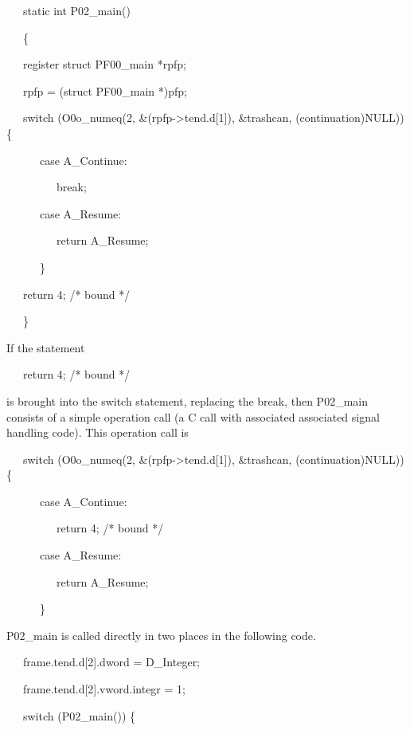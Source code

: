 {\ttfamily\mdseries
\ \ \ static int P02\_main()}

{\ttfamily\mdseries
\ \ \ \{}

{\ttfamily\mdseries
\ \ \ register struct PF00\_main *rpfp;}


\bigskip

{\ttfamily\mdseries
\ \ \ rpfp = (struct PF00\_main *)pfp;}

{\ttfamily\mdseries
\ \ \ switch (O0o\_numeq(2, \&(rpfp-{\textgreater}tend.d[1]), \&trashcan, (continuation)NULL)) \{}

{\ttfamily\mdseries
\ \ \ \ \ \ case A\_Continue:}

{\ttfamily\mdseries
\ \ \ \ \ \ \ \ \ break;}

{\ttfamily\mdseries
\ \ \ \ \ \ case A\_Resume:}

{\ttfamily\mdseries
\ \ \ \ \ \ \ \ \ return A\_Resume;}

{\ttfamily\mdseries
\ \ \ \ \ \ \}}

{\ttfamily\mdseries
\ \ \ return 4; /* bound */}

{\ttfamily\mdseries
\ \ \ \}}


If the statement 

{\ttfamily\mdseries
\ \ \ return 4; /* bound */}

\noindent is brought into the switch statement, replacing the break,
then P02\_main consists of a simple operation call (a C call with
associated associated signal handling code). This operation call is

{\ttfamily\mdseries
\ \ \ switch (O0o\_numeq(2, \&(rpfp-{\textgreater}tend.d[1]), \&trashcan, (continuation)NULL)) \{}

{\ttfamily\mdseries
\ \ \ \ \ \ case A\_Continue:}

{\ttfamily\mdseries
\ \ \ \ \ \ \ \ \ return 4; /* bound */}

{\ttfamily\mdseries
\ \ \ \ \ \ case A\_Resume:}

{\ttfamily\mdseries
\ \ \ \ \ \ \ \ \ return A\_Resume;}

{\ttfamily\mdseries
\ \ \ \ \ \ \}}


P02\_main is called directly in two places in the following code. 

{\ttfamily\mdseries
\ \ \ frame.tend.d[2].dword = D\_Integer;}

{\ttfamily\mdseries
\ \ \ frame.tend.d[2].vword.integr = 1;}

{\ttfamily\mdseries
\ \ \ switch (P02\_main()) \{}

